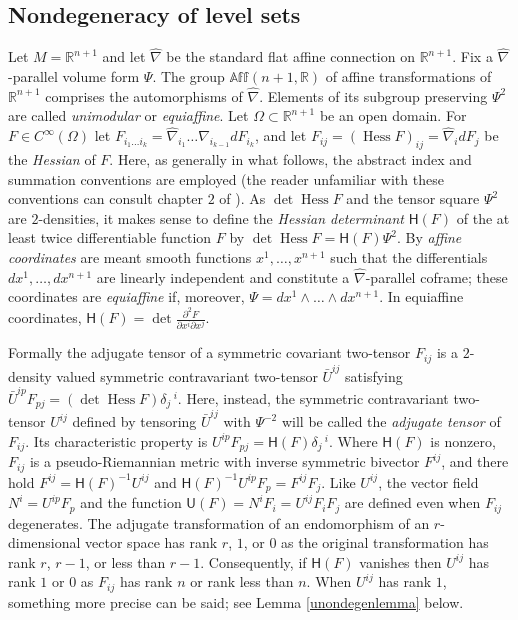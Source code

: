 \documentclass [leqno, 10pt]{amsart}
\theoremstyle{definition}
\numberwithin{equation}{section}
\newcommand{\Om}{\Omega}
\newcommand{\U}{\mathsf{U}}
\renewcommand{\H}{\mathsf{H}}
\newcommand{\hess}{\operatorname{Hess}}
\newcommand{\pr}{\partial}
\newcommand{\Aff}{\mathbb{Aff}}
\newcommand{\hnabla}{\widehat{\nabla}}
\newcommand{\rea}{\mathbb R}
\begin{document}
\subsection{Nondegeneracy of level sets}\label{ufsection}
Let $M = \rea^{n+1}$ and let $\hnabla$ be the standard flat affine connection on $\rea^{n+1}$.
Fix a $\hnabla$-parallel volume form $\Psi$. The group $\Aff(n+1, \rea)$ of affine transformations of $\rea^{n+1}$ comprises the automorphisms of $\hnabla$. Elements of its subgroup preserving $\Psi^{2}$ are called \textit{unimodular} or \textit{equiaffine}. Let $\Om \subset \rea^{n+1}$ be an open domain. For $F \in C^{\infty}(\Om)$ let $F_{i_{1}\dots i_{k}} = \hnabla_{i_{1}}\dots\hnabla_{i_{k-1}}dF_{i_{k}}$, and let $F_{ij} = (\hess F)_{ij} = \hnabla_{i}dF_{j}$ be the \textit{Hessian} of $F$. Here, as generally in what follows, the abstract index and summation conventions are employed (the reader unfamiliar with these conventions can consult chapter $2$ of \cite{Penrose-Rindler}). As $\det \hess F$ and the tensor square $\Psi^{2}$ are $2$-densities, it makes sense to define the \textit{Hessian determinant} $\H(F)$ of the at least twice differentiable function $F$ by $\det \hess F = \H(F)\Psi^{2}$. By \textit{affine coordinates} are meant smooth functions $x^{1}, \dots, x^{n+1}$ such that the differentials $dx^{1}, \dots, dx^{n+1}$ are linearly independent and constitute a $\hnabla$-parallel coframe; these coordinates are \textit{equiaffine} if, moreover, $\Psi = dx^{1}\wedge \dots \wedge dx^{n+1}$. In equiaffine coordinates, $\H(F) = \det \tfrac{\pr^{2}F}{\pr x^{i}\pr x^{j}}$. 

Formally the adjugate tensor of a symmetric covariant two-tensor $F_{ij}$ is a $2$-density valued symmetric contravariant two-tensor $\bar{U}^{ij}$ satisfying $\bar{U}^{ip}F_{pj} = (\det \hess F) \delta_{j}\,^{i}$. Here, instead, the  symmetric contravariant two-tensor $U^{ij}$ defined by tensoring $\bar{U}^{ij}$ with $\Psi^{-2}$ will be called the \textit{adjugate tensor} of $F_{ij}$. Its characteristic property is $U^{ip}F_{pj} = \H(F)\delta_{j}\,^{i}$. Where $\H(F)$ is nonzero, $F_{ij}$ is a pseudo-Riemannian metric with inverse symmetric bivector $F^{ij}$, and there hold $F^{ij} = \H(F)^{-1}U^{ij}$ and $\H(F)^{-1}U^{ip}F_{p} = F^{ij}F_{j}$. Like $U^{ij}$, the vector field $N^{i} = U^{ip}F_{p}$ and the function $\U(F) = N^{i}F_{i} = U^{ij}F_{i}F_{j}$ are defined even when $F_{ij}$ degenerates. 
The adjugate transformation of an endomorphism of an $r$-dimensional vector space has rank $r$, $1$, or $0$ as the original transformation has rank $r$, $r-1$, or less than $r-1$. Consequently, if $\H(F)$ vanishes then $U^{ij}$ has rank $1$ or $0$ as $F_{ij}$ has rank $n$ or rank less than $n$. When $U^{ij}$ has rank $1$, something more precise can be said; see Lemma \ref{unondegenlemma} below.
\end{document}
